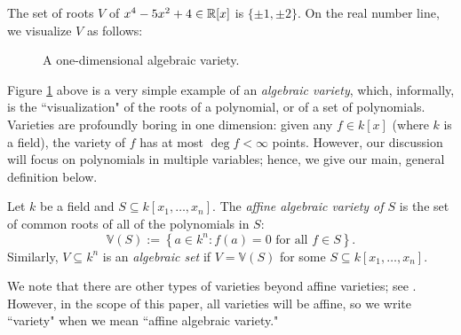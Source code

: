 \documentclass{article}
\newcommand{\V}{\mathbb V}
\begin{document}
\begin{example}\label{1dim}
The set of roots $V$ of $x^4-5x^2  +4 \in \mathbb R[x]$ is $\{\pm 1, \pm 2\}$. On the real number line, we visualize $V$ as follows:
\begin{figure}[h!]
\centering
{}
\caption{A one-dimensional algebraic variety.}
\label{1D}
\end{figure}
\end{example}
Figure \ref{1D} above is a very simple example of an \textit{algebraic variety}, which, informally, is the ``visualization" of the roots of a polynomial, or of a set of polynomials. Varieties are profoundly boring in one dimension: given any $f\in k[x]$ (where $k$ is a field), the variety of $f$ has at most $\deg f < \infty$ points. However, our discussion will focus on polynomials in multiple variables; hence, we give our main, general definition below.

\begin{definition}\label{variety}
Let $k$ be a field and $S\subseteq k[x_1, \ldots, x_n]$. The \textit{affine algebraic variety of $S$} is the set of common roots of all of the polynomials in $S$:
$$\V(S) := \left\{a\in k^n: f(a) = 0\textrm{ for all } f\in S\right\}.$$
Similarly, $V\subseteq k^n$ is an \textit{algebraic set} if $V = \V(S)$ for some $S\subseteq k[x_1, \ldots, x_n]$.
\end{definition}
We note that there are other types of varieties beyond affine varieties; see \cite{smith}. However, in the scope of this paper, all varieties will be affine, so we write ``variety" when we mean ``affine algebraic variety."
\end{document}
